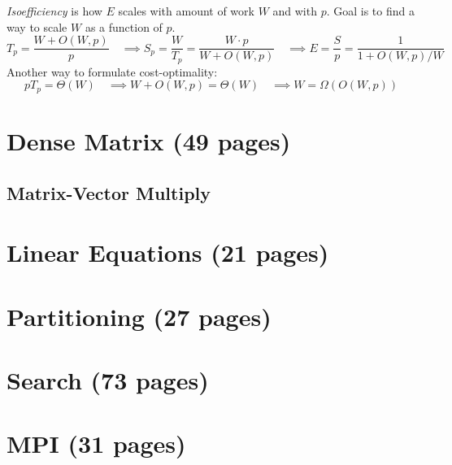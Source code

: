 \documentclass[a4paper,10pt]{article}
\begin{document}
\\
\\
\emph{Isoefficiency} is how $E$ scales with amount of work $W$ and with $p$.  Goal is to find a way to scale $W$ as a function of $p$.
$$
T_p = \frac{W + O(W, p)}{p} \quad\implies S_p = \frac{W}{T_p} = \frac{W\cdot p}{W + O(W,p)} \quad\implies E = \frac{S}{p} = \frac{1}{1 + O(W,p)/W}
$$
Another way to formulate cost-optimality:
\[pT_p = \Theta(W)\quad\implies W+O(W,p) = \Theta(W)\quad\implies W = \Omega(O(W,p))\]

\section{Dense Matrix (49 pages)}
\subsection{Matrix-Vector Multiply}
\section{Linear Equations (21 pages)}
\section{Partitioning (27 pages)}
\section{Search (73 pages)}
\section{MPI (31 pages)}
\end{document}
